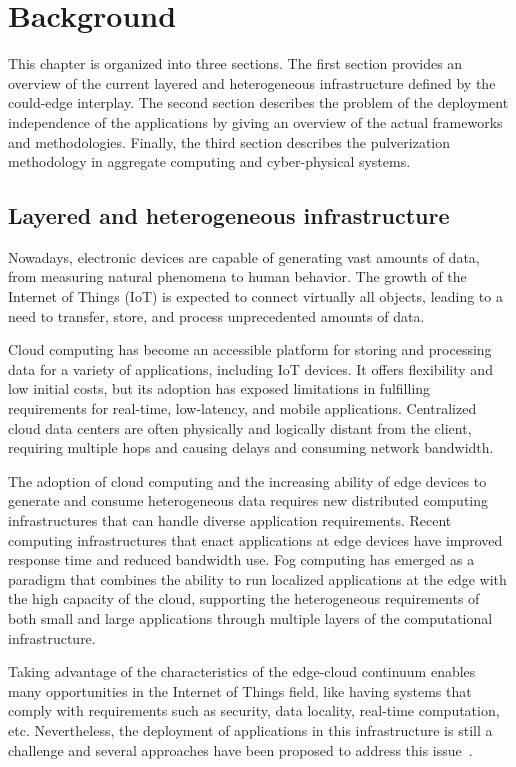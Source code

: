 \chapter{Background}
\label{chap:background}

This chapter is organized into three sections. The first section provides an overview of the current layered and heterogeneous infrastructure
defined by the could-edge interplay. The second section describes the problem of the deployment independence of the applications by giving an
overview of the actual frameworks and methodologies. Finally, the third section describes the pulverization methodology in aggregate computing and
cyber-physical systems.

\section{Layered and heterogeneous infrastructure}
\label{sec:layered-heterogeneous-infrastructure}

Nowadays, electronic devices are capable of generating vast amounts of data, from measuring natural phenomena to human behavior.
The growth of the Internet of Things (IoT) is expected to connect virtually all objects, leading to a need to transfer, store, and process
unprecedented amounts of data.

Cloud computing has become an accessible platform for storing and processing data for a variety of applications, including IoT devices. It offers
flexibility and low initial costs, but its adoption has exposed limitations in fulfilling requirements for real-time, low-latency, and mobile
applications. Centralized cloud data centers are often physically and logically distant from the client, requiring multiple hops and causing delays
and consuming network bandwidth.

The adoption of cloud computing and the increasing ability of edge devices to generate and consume heterogeneous data requires new distributed
computing infrastructures that can handle diverse application requirements. Recent computing infrastructures that enact applications at edge devices
have improved response time and reduced bandwidth use. Fog computing has emerged as a paradigm that combines the ability to run localized
applications at the edge with the high capacity of the cloud, supporting the heterogeneous requirements of both small and large applications through
multiple layers of the computational infrastructure.

Taking advantage of the characteristics of the edge-cloud continuum enables many opportunities in the Internet of Things field, like
having systems that comply with requirements such as security, data locality, real-time computation, etc.
Nevertheless, the deployment of applications in this infrastructure is still a challenge and several approaches have been
proposed to address this issue~\cite{BITTENCOURT2018134}.

